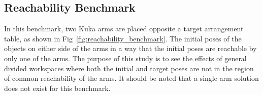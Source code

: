 {%





\subsection{Reachability Benchmark}
\label{sec:reachability}

In this benchmark, two Kuka arms are placed opposite a target arrangement table, as shown in Fig~\ref{fig:reachability_benchmark}. The initial poses of the objects on either side of the arms in a way that the initial poses are reachable by only one of the arms. The purpose of this study is to see the effects of general divided workspaces where both the initial and target poses are not in the region of common reachability of the arms.  It should be noted that a single arm solution does not exist for this benchmark. 

}
